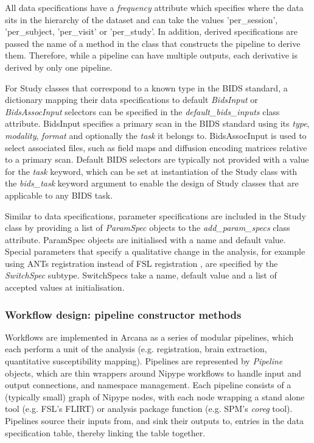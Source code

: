 \documentclass[smallextended]{svjour3}       %
\begin{document}
All data specifications have a \emph{frequency} attribute which specifies
where the data sits in the hierarchy of the
dataset and can take the values 'per\_session',
'per\_subject, 'per\_visit' or 'per\_study'. In
addition, derived specifications are passed the name of a method in the
class that constructs the pipeline to derive them. Therefore, while a
pipeline can have multiple outputs, each derivative is derived by only
one pipeline.

For Study classes that correspond to a known type in the BIDS
standard, a dictionary mapping their data specifications to default
\emph{BidsInput} or \emph{BidsAssocInput} selectors can be specified in the
\emph{default\_bids\_inputs} class attribute. BidsInput
specifies a primary scan in the BIDS standard using its \emph{type}, \emph{modality},
\emph{format} and optionally the \emph{task} it belongs to. BidsAssocInput is used to select
associated files, such as field maps and diffusion encoding matrices relative
to a primary scan. Default BIDS selectors are typically not provided with
a value for the \emph{task} keyword, which can be set at instantiation of
the Study class with the \emph{bids\_task} keyword argument to enable the design of Study
classes that are applicable to any BIDS task.

Similar to data specifications, parameter specifications are included in
the Study class by providing a list of \emph{ParamSpec} objects to
the \emph{add\_param\_specs} class attribute. ParamSpec objects
are initialised with a name and default value. Special parameters that
specify a qualitative change in the analysis, for example using ANTs
registration \citep{avants_reproducible_2011} instead of FSL registration
\citep{smith_advances_2004}, are specified by the \emph{SwitchSpec} subtype.
SwitchSpecs take a name, default value and a list of accepted values at
initialisation.

\subsubsection*{Workflow design: pipeline constructor methods}
\label{sec:pipeline-constructors}

Workflows are implemented in Arcana as a series of modular pipelines, which
each perform a unit of the analysis (e.g. registration, brain
extraction, quantitative susceptibility mapping). Pipelines are represented by \emph{Pipeline} objects,
which are thin wrappers around Nipype workflows to handle input and output
connections, and namespace management. Each pipeline consists of a
(typically small) graph of Nipype nodes, with each node wrapping a stand alone tool
(e.g. FSL's FLIRT) or analysis package function (e.g. SPM's \emph{coreg}
tool). Pipelines source their inputs from, and sink their outputs to, entries
in the data specification table, thereby linking the table together.
\end{document}
